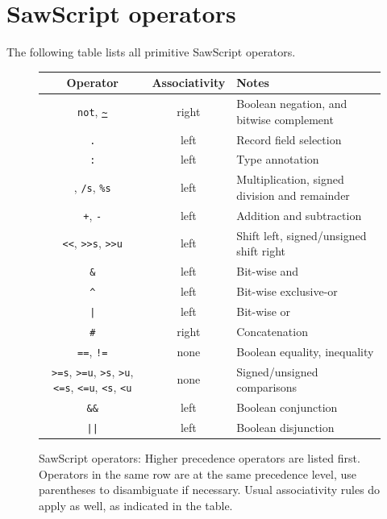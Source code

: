 \documentclass[12pt]{galois-whitepaper}
\newcommand{\sawScript}{{\sc SawScript}\xspace}
\begin{document}
\section{\sawScript operators}
The following table lists all primitive \sawScript operators.

\begin{figure}[h]
\begin{center}
\begin{tabular}{c|c|l} \hline
Operator & Associativity & Notes \\ \hline\hline
{\tt not}, {\tt \url{~}}        & right & Boolean negation, and bitwise complement      \\ \hline
{\tt .}                         & left  & Record field selection                        \\ \hline
{\tt :}                         & left  & Type annotation                               \\ \hline
{\tt *}, {\tt /s}, {\tt \%s}    & left  & Multiplication, signed division and remainder \\ \hline
{\tt +}, {\tt -}                & left  & Addition and subtraction                      \\ \hline
{\tt <<}, {\tt >>s}, {\tt >>u}  & left  & Shift left, signed/unsigned shift right       \\ \hline
{\tt \&}                        & left  & Bit-wise and                                  \\ \hline
{\tt \Verb|^|}                  & left  & Bit-wise exclusive-or                         \\ \hline
{\tt \Verb+|+}                  & left  & Bit-wise or                                   \\ \hline
{\tt \#}                        & right & Concatenation                                 \\ \hline
{\tt ==}, {\tt !=}              & none  & Boolean equality, inequality                  \\ \hline
\parbox{3cm}{
\vspace*{0.5em}
{\tt >=s}, {\tt >=u}, {\tt >s}, {\tt >u}, {\tt <=s}, {\tt <=u}, {\tt <s}, {\tt <u}
\vspace*{0.5em}
}                               & none  & Signed/unsigned comparisons                   \\ \hline
{\tt \Verb+&&+}                 & left  & Boolean conjunction                           \\ \hline
{\tt \Verb+||+}                 & left  & Boolean disjunction                           \\ \hline
\end{tabular}
\end{center}
\caption{\sawScript operators: Higher precedence operators are listed first.
Operators in the same row are at the same precedence level, use parentheses to disambiguate if necessary.
Usual associativity rules do apply as well, as indicated in the table.}
\end{figure}
\end{document}
